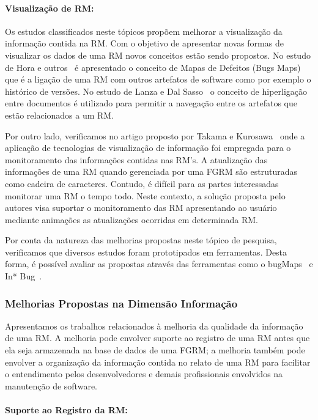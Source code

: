 \paragraph{Visualização de RM:} Os estudos classificados neste tópicos propõem
melhorar a visualização da informação contida na RM\@. Com o objetivo de
apresentar novas formas de visualizar os dados de uma RM novos conceitos estão
sendo propostos. No estudo de Hora e outros~\cite{hora2012bug} é apresentado o
conceito de Mapas de Defeitos (Bugs Maps) que é a ligação de uma RM com outros
artefatos de software como por exemplo o histórico de versões.  No estudo de
Lanza e  Dal Sasso~\cite{dal2014bug} o conceito de hiperligação entre documentos
é utilizado para permitir a navegação entre os artefatos que estão relacionados
a um RM\@.

Por outro lado, verificamos no artigo proposto por Takama e
Kurosawa~\cite{takama2013application} onde a aplicação de tecnologias de
visualização de informação foi empregada para o monitoramento das informações
contidas nas RM's. A atualização das informações de uma RM quando gerenciada por
uma FGRM são estruturadas como cadeira de caracteres. Contudo, é difícil para as
partes interessadas monitorar uma RM o tempo todo. Neste contexto, a solução
proposta pelo autores visa suportar o monitoramento das RM apresentando ao
usuário mediante animações as atualizações ocorridas em determinada RM\@.

Por conta da natureza das melhorias propostas neste tópico de pesquisa,
verificamos que diversos estudos foram prototipados em ferramentas. Desta forma,
é possível avaliar as propostas através das ferramentas como o
bugMaps~\cite{hora2012bug} e In* Bug~\cite{dal2014bug}.

\subsubsection{Melhorias Propostas na Dimensão Informação}
\label{ssub:melhorias_dim_informacao}

Apresentamos os trabalhos relacionados à melhoria da qualidade da informação de
uma RM. A melhoria pode envolver suporte ao registro de uma RM antes que ela
seja armazenada na base de dados de uma FGRM\@; a melhoria também pode envolver
a organização da informação contida no relato de uma RM para facilitar o
entendimento pelos desenvolvedores e demais profissionais envolvidos na
manutenção de software.

\paragraph{Suporte ao Registro da RM:}

